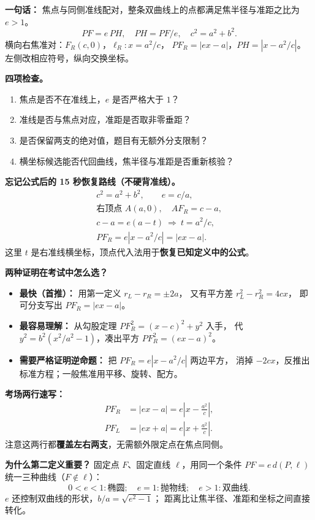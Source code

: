 \begin{summarybox}
\textbf{一句话：} 焦点与同侧准线配对，整条双曲线上的点都满足焦半径与准距之比为 $e>1$。
\[
PF=e\,PH,\quad PH=PF/e,\quad c^2=a^2+b^2.
\]
横向右焦准对：$F_R(c,0)$，$\ell_R:x=a^2/c$，
$PF_R=|ex-a|$，$PH=|x-a^2/c|$。左侧改相应符号，纵向交换坐标。

\textbf{四项检查。}
\begin{enumerate}[leftmargin=*]
\item 焦点是否不在准线上，$e$ 是否严格大于 $1$？
\item 准线是否与焦点对应，准距是否取非零垂距？
\item 是否保留两支的绝对值，题目有无额外分支限制？
\item 横坐标候选能否代回曲线，焦半径与准距是否重新核验？
\end{enumerate}
\end{summarybox}
\clearpage
\begin{summarybox}

\medskip
\textbf{忘记公式后的 15 秒恢复路线（不硬背准线）。}
\[
\boxed{\begin{gathered}
c^2=a^2+b^2,\qquad e=c/a,\\
\text{右顶点 }A(a,0),\quad AF_R=c-a,\\
c-a=e(a-t)\ \Longrightarrow\ \boxed{t=a^2/c},\\
PF_R=e\left|x-a^2/c\right|=|ex-a|.
\end{gathered}}
\]
这里 $t$ 是右准线横坐标，顶点代入法用于\textbf{恢复已知定义中的公式}。

\textbf{两种证明在考试中怎么选？}
\begin{itemize}
\item \textbf{最快（首推）：} 用第一定义 $r_L-r_R=\pm2a$，
又有平方差 $r_L^2-r_R^2=4cx$，
即可分支写出 $PF_R=|ex-a|$。
\item \textbf{最容易理解：} 从勾股定理 $PF_R^2=(x-c)^2+y^2$ 入手，
代 $y^2=b^2(x^2/a^2-1)$，凑出平方 $PF_R^2=(ex-a)^2$。
\item \textbf{需要严格证明逆命题：} 把 $PF_R=e|x-a^2/c|$ 两边平方，
消掉 $-2cx$，反推出标准方程；一般焦准用平移、旋转、配方。
\end{itemize}

\textbf{考场两行速写：}
\[
\boxed{\begin{aligned}
PF_R&=|ex-a|=e\left|x-\frac{a^2}{c}\right|,\\
PF_L&=|ex+a|=e\left|x+\frac{a^2}{c}\right|.
\end{aligned}}
\]
注意这两行都\textbf{覆盖左右两支}，无需额外限定点在焦点同侧。

\textbf{为什么第二定义重要？}
固定点 $F$、固定直线 $\ell$，用同一个条件
$PF=e\,d(P,\ell)$ 统一三种曲线（$F\notin\ell$）：
\[
\boxed{0<e<1:\text{椭圆};\quad e=1:\text{抛物线};\quad e>1:\text{双曲线}.}
\]
$e$ 还控制双曲线的形状，$b/a=\sqrt{e^2-1}$；
距离比让焦半径、准距和坐标之间直接转化。

\end{summarybox}
